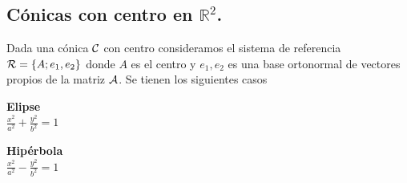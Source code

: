 \documentclass[11pt, a4paper]{article}
\newif\IfInSansMode
\let\oldsf\sffamily
\renewcommand*{\sffamily}{\oldsf\mathversion{sans}\InSansModetrue}
\theoremstyle{theorem-style}
\theoremstyle{definition-style}
\theoremstyle{remark-style}
\theoremstyle{example-style}
\begin{document}
\subsection{\bf  C\'onicas con centro en $\mathbb{R}^2$.}

\vspace{.5cm}

Dada una c\'onica $\cal C$ con centro consideramos el sistema de referencia 
${\cal R}=\{A; e_1,e_2\}$ donde $A$ 
es el centro y $e_1,e_2$ es una base ortonormal de vectores propios de la matriz $\cal A$. Se tienen los siguientes casos

\begin{minipage}[c]{0.45\textwidth}
  {\bf Elipse}\vspace{1em}\\
  $\displaystyle \frac{{x}^2}{a^2} + \frac{{y}^2}{b^2} = 1$
\end{minipage}\hfill
\begin{minipage}[]{0.35\textwidth}
\end{minipage}

\begin{minipage}[c]{0.45\textwidth}
  {\bf Hipérbola}\vspace{1em}\\
  $\displaystyle \frac{{x}^2}{a^2} - \frac{{y}^2}{b^2} = 1$
\end{minipage}\hfill
\begin{minipage}[]{0.35\textwidth}
\end{minipage}



\vspace{.8cm}
\end{document}
